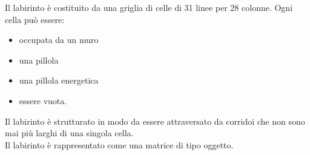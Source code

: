 \documentclass[8pt]{book}
\begin{document}
Il labirinto è costituito da una griglia di celle di 31 linee per 28 colonne. Ogni cella può essere:

\begin{itemize}

\item
  occupata da un muro
\item
  una pillola
\item
  una pillola energetica
\item
  essere vuota.
\end{itemize}

Il labirinto è strutturato in modo da essere attraversato da corridoi che non sono mai più larghi di una singola cella.\\
Il labirinto è rappresentato come una matrice di tipo oggetto.\\

\end{document}
